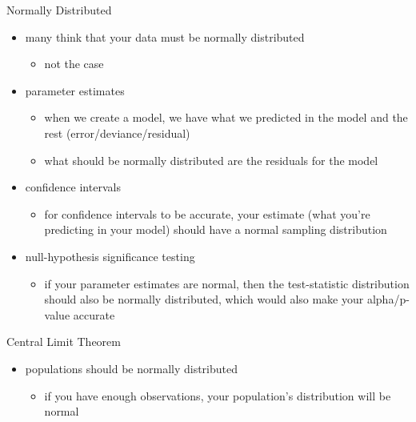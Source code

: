 \documentclass[
  ignorenonframetext,
]{beamer}
\providecommand{\tightlist}{%
  \setlength{\itemsep}{0pt}\setlength{\parskip}{0pt}}
\begin{document}
\begin{frame}{Normally Distributed}
\protect\hypertarget{normally-distributed}{}
\begin{itemize}
\item
  many think that your data must be normally distributed

  \begin{itemize}
  \tightlist
  \item
    not the case
  \end{itemize}
\item
  parameter estimates

  \begin{itemize}
  \item
    when we create a model, we have what we predicted in the model and
    the rest (error/deviance/residual)
  \item
    what should be normally distributed are the residuals for the model
  \end{itemize}
\item
  confidence intervals

  \begin{itemize}
  \tightlist
  \item
    for confidence intervals to be accurate, your estimate (what you're
    predicting in your model) should have a normal sampling distribution
  \end{itemize}
\item
  null-hypothesis significance testing

  \begin{itemize}
  \tightlist
  \item
    if your parameter estimates are normal, then the test-statistic
    distribution should also be normally distributed, which would also
    make your alpha/p-value accurate
  \end{itemize}
\end{itemize}
\end{frame}

\begin{frame}{Central Limit Theorem}
\protect\hypertarget{central-limit-theorem}{}
\begin{itemize}
\item
  populations should be normally distributed

  \begin{itemize}
  \tightlist
  \item
    if you have enough observations, your population's distribution will
    be normal
  \end{itemize}
\end{itemize}
\end{frame}
\end{document}

